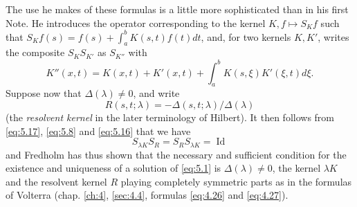 \documentclass[12pt,a4paper,leqno,twoside]{extbook}
\begin{document}
The use he makes of these formulas is a little more sophisticated than in his first Note. He introduces the operator corresponding to the kernel \(K, f \mapsto S_K f\) such that \(S_K f(s) = f(s) + \int_a^b K(s, t)f(t)dt\), and, for two kernels \(K, K'\), writes the composite \(S_K S_{K'}\) as \(S_{K''}\) with
\begin{equation}
    \label{eq:5.17}
    K''(x,t) = K(x, t) + K'(x, t) + \int_a^b K(s, \xi)K'(\xi, t)d\xi.
\end{equation}
Suppose now that \(\Delta(\lambda) \neq 0\), and write
\begin{equation}
    \label{eq:5.18}
    R(s, t; \lambda) = -\Delta(s, t; \lambda)/\Delta(\lambda)
\end{equation}
(the \emph{resolvent kernel} in the later terminology of Hilbert). It then follows from \eqref{eq:5.17}, \eqref{eq:5.8} and \eqref{eq:5.16} that we have
\begin{equation}
    \label{eq:5.19}
    S_{\lambda K} S_R = S_R S_{\lambda K} = \operatorname{Id}
\end{equation}
and Fredholm has thus shown that the necessary and sufficient condition for the existence and uniqueness of a solution of \eqref{eq:5.1} is \(\Delta(\lambda) \neq 0\), the kernel \(\lambda K\) and the resolvent kernel \(R\) playing completely symmetric parts as in the formulas of Volterra (chap. \ref{ch:4}, \ref{sec:4.4}, formulas \eqref{eq:4.26} and \eqref{eq:4.27}).
\end{document}
